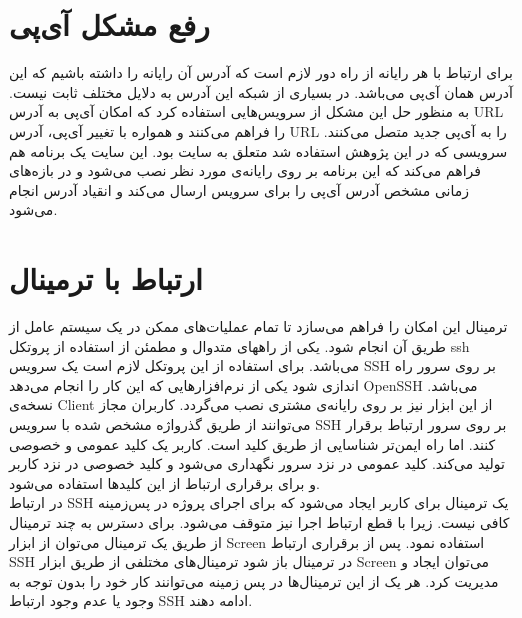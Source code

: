 \section{
	رفع مشکل آی‌پی 
}

برای ارتباط با هر رایانه از راه دور لازم است که آدرس آن رایانه را داشته باشیم که این آدرس همان آی‌پی می‌باشد. در بسیاری از شبکه این آدرس  به دلایل مختلف ثابت نیست. به منظور حل این مشکل از سرویس‌هایی استفاده کرد که امکان  آی‌پی به آدرس URL را فراهم می‌کنند و همواره با تغییر آی‌پی، آدرس URL را به آی‌پی جدید متصل می‌کنند. سرویسی که در این پژوهش استفاده شد متعلق به سایت
 بود. این سایت یک برنامه هم فراهم می‌کند که این برنامه بر روی رایانه‌ی مورد نظر نصب می‌شود و در بازه‌های زمانی مشخص آدرس آی‌پی را برای سرویس ارسال می‌کند و انقیاد آدرس انجام می‌شود. 
\section{ارتباط با ترمینال}
ترمینال این امکان را فراهم می‌سازد تا تمام عملیات‌های ممکن در یک سیستم عامل از طریق آن انجام شود. یکی از راههای متدوال و مطمئن از استفاده از پروتکل ssh می‌باشد. برای استفاده از این پروتکل لازم است یک سرویس SSH بر روی سرور راه اندازی شود یکی از نرم‌افزارهایی که این کار را انجام می‌دهد OpenSSH می‌باشد. نسخه‌ی Client از این ابزار نیز بر روی رایانه‌ی مشتری نصب می‌گردد. کاربران مجاز می‌توانند از طریق گذرواژه  مشخص شده با سرویس   SSH بر روی سرور ارتباط برقرار کنند. اما راه ایمن‌تر شناسایی از طریق کلید است. کاربر یک کلید عمومی و خصوصی تولید می‌کند. کلید عمومی در نزد سرور نگهداری می‌شود و کلید خصوصی در نزد کاربر و برای برقراری ارتباط از این کلید‌ها استفاده می‌شود.\\

در ارتباط SSH یک ترمینال برای کاربر ایجاد می‌شود که برای اجرای پروژه در پس‌زمینه کافی نیست. زیرا با قطع ارتباط اجرا نیز متوقف می‌شود. برای دسترس به چند ترمینال از طریق یک ترمینال می‌توان از ابزار Screen استفاده نمود. پس از برقراری ارتباط SSH در ترمینال باز شود ترمینال‌های مختلفی از طریق ابزار Screen می‌توان ایجاد و مدیریت کرد. هر یک از این ترمینال‌ها در پس زمینه می‌توانند کار خود را بدون توجه به وجود یا عدم وجود ارتباط SSH ادامه دهند. 
